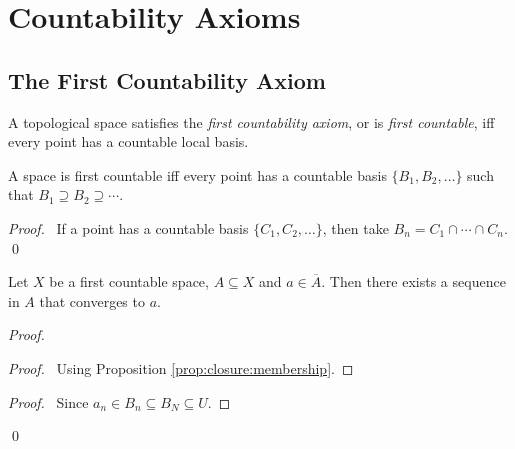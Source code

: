 \chapter{Countability Axioms}

\section{The First Countability Axiom}

\begin{df}
  A topological space satisfies the \emph{first countability axiom}, or is \emph{first countable}, iff every point has a countable local basis.
\end{df}

\begin{prop}
  A space is first countable iff every point has a countable basis $\{ B_1, B_2, \ldots \}$ such that $B_1 \supseteq B_2 \supseteq \cdots$.
\end{prop}

\begin{proof}
  \pf\ If a point has a countable basis $\{ C_1, C_2, \ldots \}$, then take $B_n = C_1 \cap \cdots \cap C_n$. \qed
\end{proof}

\begin{prop}
  Let $X$ be a first countable space, $A \subseteq X$ and $a \in \overline{A}$. Then there exists a sequence in $A$ that converges to $a$.
\end{prop}

\begin{proof}
  \pf
  \begin{proof}
    \pf\ Using Proposition \ref{prop:closure:membership}.
  \end{proof}
  \begin{proof}
    \pf\ Since $a_n \in B_n \subseteq B_N \subseteq U$.
  \end{proof}
  \qed
\end{proof}

